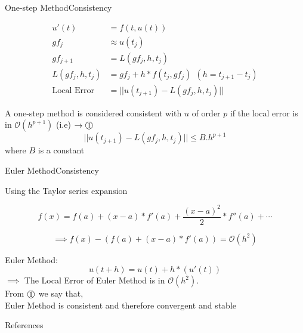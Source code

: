 \documentclass{beamer}
\begin{document}
\begin{frame}{One-step Method}{Consistency}
  \begin{center}
            \begin{equation*}
            \begin{aligned}
                u'(t) &= f(t,u(t))    \\
                gf_j &\approx u(t_j) \\
                gf_{j+1} &= L(gf_j,h,t_j) \\
                L(gf_j,h,t_j) &= gf_j + h*f(t_j,gf_j) \ \ (h = t_{j+1} - t_j)\\ 
                \text{Local Error} &= ||u(t_{j+1}) - L(gf_j,h,t_j)||
            \end{aligned}
            \end{equation*}
            \end{center}
        
        A one-step method is considered consistent with $u$ of order $p$ if the local error is in  $\mathcal{O}(h^{p+1})$ (i.e)   $\rightarrow \raisebox{.5pt}
{\textcircled{\raisebox{-.95pt} {1}}}$ \cite{Wolf}
        $$||u(t_{j+1}) - L(gf_j,h,t_j)|| \leq B.h^{p+1}$$ 
            \hfill where $B$ is a constant 
  
  
\end{frame}

\begin{frame}{Euler Method}{Consistency}
  
  Using the Taylor series expansion
 
 $$f(x) = f(a) + (x-a)*f'(a) + \frac{(x-a)^2}{2}*f''(a) + \cdots$$
 
 $$\implies f(x) - (f(a) + (x-a)*f'(a)) = \mathcal{O}(h^2)$$

Euler Method:                              
    $$u(t+h) = u(t) + h*(u'(t))$$                                        
   $\implies$ The Local Error of Euler Method is in $\mathcal{O}(h^2)$.\\
   
   From $\raisebox{.5pt}
{\textcircled{\raisebox{-.95pt} {1}}}$ we say that,\\ \hfill Euler Method is consistent and therefore convergent and stable                         
\end{frame}

\begin{frame}{References}


\end{frame}
\end{document}

